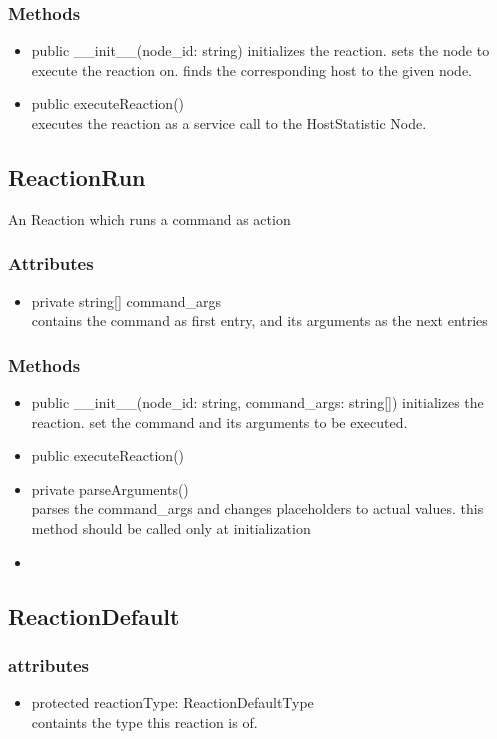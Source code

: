 \subsubsection{Methods}
\begin{itemize}
	\item public \_\_init\_\_(node\_id: string)
		initializes the reaction. sets the node to execute the reaction on. finds the corresponding host to the given node.
	\item public executeReaction()\\
		executes the reaction as a service call to the HostStatistic Node.
\end{itemize}


\subsection{ReactionRun}
	An Reaction which runs a command as action 
\subsubsection{Attributes}
\begin{itemize}
	\item private string[] command\_args
	\\ contains the command as first entry, and its arguments as the next entries
\end{itemize}
\subsubsection{Methods}
\begin{itemize}
	\item public \_\_init\_\_(node\_id: string, command\_args: string[])
		initializes the reaction. set the command and its arguments to be executed.
	\item public executeReaction()\\
	\item private parseArguments()\\
		parses the command\_args and changes placeholders to actual values. this method should be called only at initialization
	\item 
\end{itemize}


\subsection{ReactionDefault}
\subsubsection{attributes}
\begin{itemize}
	\item protected reactionType: ReactionDefaultType\\
		containts the type this reaction is of.
\end{itemize}
